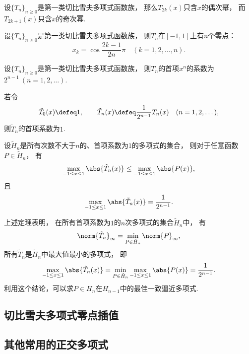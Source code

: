 \begin{property}
设\(\{T_n\}_{n\geq0}\)是第一类切比雪夫多项式函数族，
那么\(T_{2k}(x)\)只含\(x\)的偶次幂，
而\(T_{2k+1}(x)\)只含\(x\)的奇次幂.
\end{property}

\begin{property}
设\(\{T_n\}_{n\geq0}\)是第一类切比雪夫多项式函数族，
则\(T_n\)在\([-1,1]\)上有\(n\)个零点：\begin{equation}
	x_k = \cos\frac{2k-1}{2n}\pi
	\quad(k=1,2,\dotsc,n).
\end{equation}
\end{property}

\begin{property}
设\(\{T_n\}_{n\geq0}\)是第一类切比雪夫多项式函数族，
则\(T_n\)的首项\(x^n\)的系数为\(2^{n-1}\ (n=1,2,\dotsc)\).
\end{property}

若令\begin{equation*}
	\tilde{T}_0(x) \defeq 1,
	\qquad
	\tilde{T}_n(x) \defeq \frac1{2^{n-1}} T_n(x)
	\quad(n=1,2,\dotsc),
\end{equation*}
则\(\tilde{T}_n\)的首项系数为\(1\).

\begin{theorem}
设\(\tilde{H}_n\)是所有次数不大于\(n\)的、首项系数为\(1\)的多项式的集合，
则对于任意函数\(P \in \tilde{H}_n\)，
有\begin{equation*}
	\max_{-1 \leq x \leq 1} \abs{\tilde{T}_n(x)}
	\leq \max_{-1 \leq x \leq 1} \abs{P(x)},
\end{equation*}
且\begin{equation*}
	\max_{-1 \leq x \leq 1} \abs{\tilde{T}_n(x)}
	= \frac1{2^{n-1}}.
\end{equation*}
\end{theorem}
\begin{remark}
上述定理表明，
在所有首项系数为\(1\)的\(n\)次多项式的集合\(\tilde{H}_n\)中，
有\begin{equation*}
	\norm{\tilde{T}_n}_\infty
	= \min_{P \in \tilde{H}_n} \norm{P}_\infty,
\end{equation*}
所有\(\tilde{T}_n\)是\(\tilde{H}_n\)中最大值最小的多项式，
即\begin{equation*}
	\max_{-1 \leq x \leq 1} \abs{\tilde{T}_n(x)}
	= \min_{P \in \tilde{H}_n} \max_{-1 \leq x \leq 1} \abs{P(x)}
	= \frac1{2^{n-1}}.
\end{equation*}
利用这个结论，可以求\(P \in H_n\)在\(H_{n-1}\)中的最佳一致逼近多项式.
\end{remark}

\subsection{切比雪夫多项式零点插值}

\subsection{其他常用的正交多项式}

